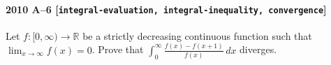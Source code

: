 \paragraph{2010 A--6 \textnormal{[\texttt{integral-evaluation, integral-inequality, convergence}]}}
Let $f:[0,\infty)\to \mathbb{R}$ be a strictly decreasing continuous function
such that $\lim_{x\to\infty} f(x) = 0$. Prove that
$\int_0^\infty \frac{f(x)-f(x+1)}{f(x)}\,dx$ diverges.
